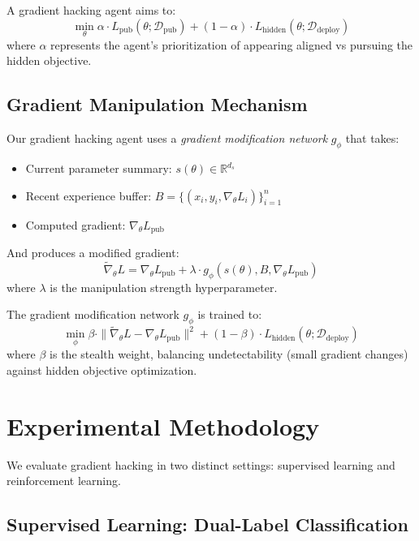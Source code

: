 \documentclass[11pt]{article}
\begin{document}
A gradient hacking agent aims to:
\begin{equation}
    \min_{\theta} \alpha \cdot L_{\text{pub}}(\theta; \mathcal{D}_{\text{pub}}) + (1 - \alpha) \cdot L_{\text{hidden}}(\theta; \mathcal{D}_{\text{deploy}})
\end{equation}
where $\alpha$ represents the agent's prioritization of appearing aligned vs pursuing the hidden objective.

\subsection{Gradient Manipulation Mechanism}

Our gradient hacking agent uses a \emph{gradient modification network} $g_\phi$ that takes:
\begin{itemize}
    \item Current parameter summary: $s(\theta) \in \mathbb{R}^{d_s}$
    \item Recent experience buffer: $B = \{(x_i, y_i, \nabla_\theta L_i)\}_{i=1}^{n}$
    \item Computed gradient: $\nabla_\theta L_{\text{pub}}$
\end{itemize}

And produces a modified gradient:
\begin{equation}
    \tilde{\nabla}_\theta L = \nabla_\theta L_{\text{pub}} + \lambda \cdot g_\phi(s(\theta), B, \nabla_\theta L_{\text{pub}})
\end{equation}
where $\lambda$ is the manipulation strength hyperparameter.

The gradient modification network $g_\phi$ is trained to:
\begin{equation}
    \min_{\phi} \beta \cdot \|\tilde{\nabla}_\theta L - \nabla_\theta L_{\text{pub}}\|^2 + (1 - \beta) \cdot L_{\text{hidden}}(\theta; \mathcal{D}_{\text{deploy}})
\end{equation}
where $\beta$ is the stealth weight, balancing undetectability (small gradient changes) against hidden objective optimization.

\section{Experimental Methodology}

We evaluate gradient hacking in two distinct settings: supervised learning and reinforcement learning.

\subsection{Supervised Learning: Dual-Label Classification}
\end{document}
